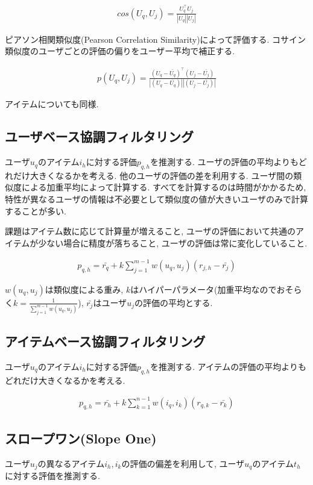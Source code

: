 \documentclass[dvipdfmx, 10pt]{jsarticle}
\begin{document}
\begin{align*}
    cos(U_q, U_j) 
    = \frac{U_q^{\top} U_j}{|U_q| |U_j|}
\end{align*}

ピアソン相関類似度(Pearson Correlation Similarity)によって評価する. 
コサイン類似度のユーザごとの評価の偏りをユーザー平均で補正する. 

\begin{align*}
    p(U_q, U_j) 
    = \frac{(U_q - \bar{U_q})^{\top} (U_j - \bar{U_j})}{|(U_q - \bar{U_q})| |(U_j - \bar{U_j})|}
\end{align*}

アイテムについても同様. 

\subsection*{ユーザベース協調フィルタリング}
ユーザ\(u_q\)のアイテム\(i_h\)に対する評価\(p_{q, h}\)を推測する. 
ユーザの評価の平均よりもどれだけ大きくなるかを考える. 
他のユーザの評価の差を利用する. ユーザ間の類似度による加重平均によって計算する. 
すべてを計算するのは時間がかかるため, 特性が異なるユーザの情報は不必要として類似度の値が大きいユーザのみで計算することが多い. 

課題はアイテム数に応じて計算量が増えること, ユーザの評価において共通のアイテムが少ない場合に精度が落ちること, 
ユーザの評価は常に変化していること. 

\begin{align*}
    p_{q, h} = \bar{r_q} + k \sum_{j=1}^{m-1} w(u_q, u_j) (r_{j, h} - \bar{r_j})
\end{align*}

\(w(u_q, u_j)\)は類似度による重み, \(k\)はハイパーパラメータ(加重平均なのでおそらく\(k = \frac{1}{\sum_{j=1}^{m-1}w(u_q, u_j)}\)), 
\(\bar{r_j}\)はユーザ\(u_j\)の評価の平均とする. 

\subsection*{アイテムベース協調フィルタリング}
ユーザ\(u_q\)のアイテム\(i_h\)に対する評価\(p_{q, h}\)を推測する. 
アイテムの評価の平均よりもどれだけ大きくなるかを考える. 

\begin{align*}
    p_{q, h} = \bar{r_h} + k \sum_{k=1}^{n-1} w(i_q, i_k) (r_{q, k} - \bar{r_k})
\end{align*}

\subsection*{スロープワン(Slope One)}
ユーザ\(u_j\)の異なるアイテム\(i_h, i_k\)の評価の偏差を利用して, ユーザ\(u_q\)のアイテム\(t_h\)に対する評価を推測する. 
\end{document}
